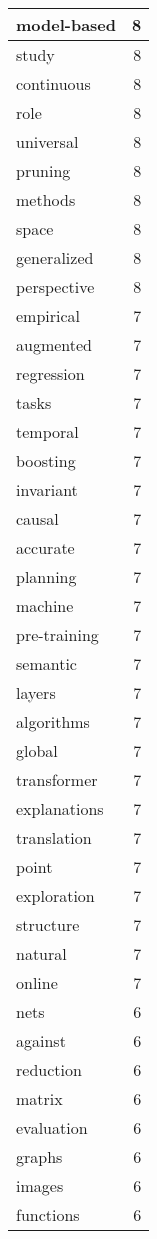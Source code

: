 \begin{table}[h]
\begin{tabular}{|l|r|}
\hline
model-based & 8 \\
\hline
study & 8 \\
\hline
continuous & 8 \\
\hline
role & 8 \\
\hline
universal & 8 \\
\hline
pruning & 8 \\
\hline
methods & 8 \\
\hline
space & 8 \\
\hline
generalized & 8 \\
\hline
perspective & 8 \\
\hline
empirical & 7 \\
\hline
augmented & 7 \\
\hline
regression & 7 \\
\hline
tasks & 7 \\
\hline
temporal & 7 \\
\hline
boosting & 7 \\
\hline
invariant & 7 \\
\hline
causal & 7 \\
\hline
accurate & 7 \\
\hline
planning & 7 \\
\hline
machine & 7 \\
\hline
pre-training & 7 \\
\hline
semantic & 7 \\
\hline
layers & 7 \\
\hline
algorithms & 7 \\
\hline
global & 7 \\
\hline
transformer & 7 \\
\hline
explanations & 7 \\
\hline
translation & 7 \\
\hline
point & 7 \\
\hline
exploration & 7 \\
\hline
structure & 7 \\
\hline
natural & 7 \\
\hline
online & 7 \\
\hline
nets & 6 \\
\hline
against & 6 \\
\hline
reduction & 6 \\
\hline
matrix & 6 \\
\hline
evaluation & 6 \\
\hline
graphs & 6 \\
\hline
images & 6 \\
\hline
functions & 6 \\

\end{tabular}
\end{table}
